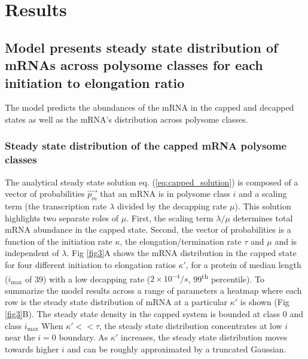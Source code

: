 \documentclass[10pt,letterpaper]{article}
\newcommand{\imax}{\ensuremath{{i_{\max}}}\xspace}
\begin{document}
\section*{Results}

\subsection*{Model presents steady state distribution of mRNAs across polysome classes for each initiation to elongation ratio}

The model predicts the abundances of the mRNA in the capped and decapped states as well as the mRNA's distribution across polysome classes.

\subsubsection*{Steady state distribution of the capped mRNA polysome classes}

The analytical steady state solution eq. (\ref{eq:capped_solution}) is composed of a vector of probabilities $\vec{p_m}$ that an mRNA is in polysome class $i$ and a scaling term (the transcription rate $\lambda$ divided by the decapping rate $\mu$). 
This solution highlights two separate roles of $\mu$. 
First, the scaling term $\lambda / \mu$ determines total mRNA abundance in the capped state. 
Second, the vector of probabilities is a function of the initiation rate $\kappa$, the elongation/termination rate $\tau$ and $\mu$ and is independent of $\lambda$.
Fig \ref{fig3}A shows the mRNA distribution in the capped state for four different initiation to elongation ratios $\kappa'$, for a protein of median length (\imax of 39) with a low decapping rate ($2\times10^{-4} /s$, 99\textsuperscript{th} percentile).
To summarize the model results across a range of parameters a heatmap where each row is the steady state distribution of mRNA at a particular $\kappa'$ is shown (Fig \ref{fig3}B).
The steady state density in the capped system is bounded at class 0 and class \imax 
When $\kappa'<<\tau$, the steady state distribution concentrates at low $i$ near the $i=0$ boundary.
As $\kappa'$ increases, the steady state distribution moves towards higher $i$ and can be roughly approximated by a truncated Gaussian. 
\end{document}
